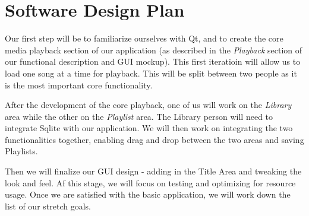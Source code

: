 \documentclass[12pt]{article}
\begin{document}
\section{Software Design Plan}
%
%
%

Our first step will be to familiarize ourselves with Qt, and to create the core media playback section of our application (as described in the \emph{Playback} section of our functional description and GUI mockup). This first iteratioin will allow us to load one song at a time for playback. This will be split between two people as it is the most important core functionality.

After the development of the core playback, one of us will work on the \emph{Library} area while the other on the \emph{Playlist} area. The Library person will need to integrate Sqlite with our application. We will then work on integrating the two functionalities together, enabling drag and drop between the two areas and saving Playlists.

Then we will finalize our GUI design - adding in the Title Area and tweaking the look and feel. Af this stage, we will focus on testing and optimizing for resource usage. Once we are satisfied with the basic application, we will work down the list of our stretch goals.
\end{document}
